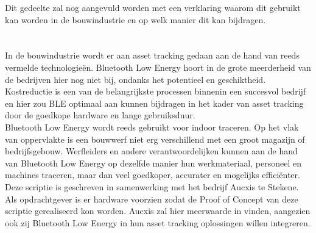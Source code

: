 Dit gedeelte zal nog aangevuld worden met een verklaring waarom dit gebruikt kan worden in de bouwindustrie en op welk manier dit kan bijdragen.

\section{}%
\label{sec:probleemstelling}


In de bouwindustrie wordt er aan asset tracking gedaan aan de hand van reeds vermelde technologieën. Bluetooth Low Energy hoort in de grote meerderheid van de bedrijven hier nog niet bij, ondanks het potentieel en geschiktheid. Kostreductie is een van de belangrijkste processen binnenin een succesvol bedrijf en hier zou BLE optimaal aan kunnen bijdragen in het kader van asset tracking door de goedkope hardware en lange gebruiksduur.\\

Bluetooth Low Energy wordt reeds gebruikt voor indoor traceren. Op het vlak van oppervlakte is een bouwwerf niet erg verschillend met een groot magazijn of bedrijfsgebouw.
Werfleiders en andere verantwoordelijken kunnen aan de hand van Bluetooth Low Energy op dezelfde manier hun werkmateriaal, personeel en machines traceren, maar dan veel goedkoper, accurater en mogelijks efficiënter. \\

Deze scriptie is geschreven in samenwerking met het bedrijf Aucxis te Stekene. Als opdrachtgever is er hardware voorzien zodat de Proof of Concept van deze scriptie gerealiseerd kon worden. Aucxis zal hier meerwaarde in vinden, aangezien ook zij Bluetooth Low Energy in hun asset tracking oplossingen willen integreren.

\section{}%
\label{sec:onderzoeksvraag}

